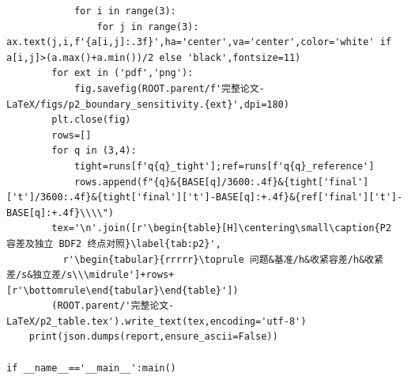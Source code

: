 \begin{verbatim}
            for i in range(3):
                for j in range(3): ax.text(j,i,f'{a[i,j]:.3f}',ha='center',va='center',color='white' if a[i,j]>(a.max()+a.min())/2 else 'black',fontsize=11)
        for ext in ('pdf','png'):
            fig.savefig(ROOT.parent/f'完整论文-LaTeX/figs/p2_boundary_sensitivity.{ext}',dpi=180)
        plt.close(fig)
        rows=[]
        for q in (3,4):
            tight=runs[f'q{q}_tight'];ref=runs[f'q{q}_reference']
            rows.append(f"{q}&{BASE[q]/3600:.4f}&{tight['final']['t']/3600:.4f}&{tight['final']['t']-BASE[q]:+.4f}&{ref['final']['t']-BASE[q]:+.4f}\\\\")
        tex='\n'.join([r'\begin{table}[H]\centering\small\caption{P2 容差及独立 BDF2 终点对照}\label{tab:p2}',
          r'\begin{tabular}{rrrrr}\toprule 问题&基准/h&收紧容差/h&收紧差/s&独立差/s\\\midrule']+rows+[r'\bottomrule\end{tabular}\end{table}'])
        (ROOT.parent/'完整论文-LaTeX/p2_table.tex').write_text(tex,encoding='utf-8')
    print(json.dumps(report,ensure_ascii=False))

if __name__=='__main__':main()

\end{verbatim}

